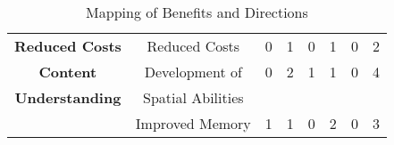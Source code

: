 \begin{landscape}
\begin{table}[!htb]
\begin{adjustwidth}{-1.25cm}{}
\begin{tabular}{c | c | c | c | c | c | c | c}
        \cline{1-8}
        \textbf{Reduced Costs} & Reduced Costs & 0 & 1 & 0 & 1 & 0 & 2 \\
        \cline{1-8}
        \textbf{Content} & Development of & 0 & 2 & 1 & 1 & 0 & 4 \\ \textbf{Understanding} & Spatial Abilities & & & & & \\
        \cline{2-8}
        & Improved Memory & 1 & 1 & 0 & 2 & 0 & 3 \\
    \end{tabular}
    \end{adjustwidth}
    \caption[Mapping of Benefits and Directions]{Mapping of Benefits and Directions}
    \label{tab:MapBenefitsDirections}
\end{table}
\end{landscape}